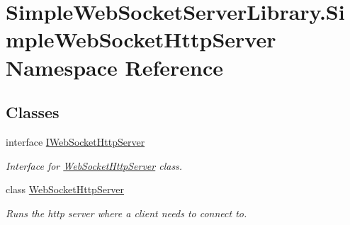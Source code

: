 \hypertarget{namespace_simple_web_socket_server_library_1_1_simple_web_socket_http_server}{}\section{Simple\+Web\+Socket\+Server\+Library.\+Simple\+Web\+Socket\+Http\+Server Namespace Reference}
\label{namespace_simple_web_socket_server_library_1_1_simple_web_socket_http_server}
\subsection*{Classes}
\begin{DoxyCompactItemize}
\item 
interface \mbox{\hyperlink{interface_simple_web_socket_server_library_1_1_simple_web_socket_http_server_1_1_i_web_socket_http_server}{I\+Web\+Socket\+Http\+Server}}
\begin{DoxyCompactList}\small\item\em Interface for \mbox{\hyperlink{class_simple_web_socket_server_library_1_1_simple_web_socket_http_server_1_1_web_socket_http_server}{Web\+Socket\+Http\+Server}} class. \end{DoxyCompactList}\item 
class \mbox{\hyperlink{class_simple_web_socket_server_library_1_1_simple_web_socket_http_server_1_1_web_socket_http_server}{Web\+Socket\+Http\+Server}}
\begin{DoxyCompactList}\small\item\em Runs the http server where a client needs to connect to. \end{DoxyCompactList}\end{DoxyCompactItemize}
